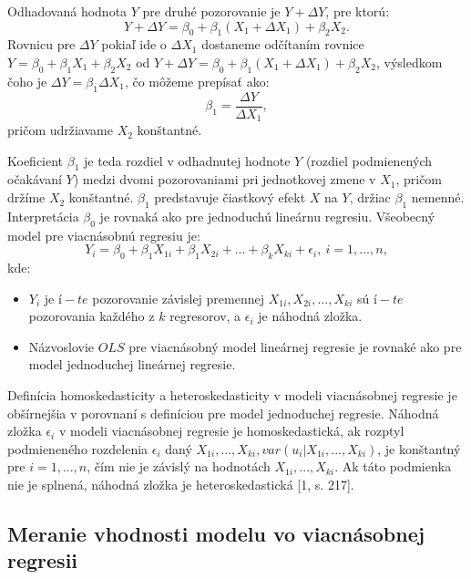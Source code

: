 \documentclass[]{tukediphc}
\begin{document}
Odhadovaná hodnota $Y$ pre druhé pozorovanie je $Y + \Delta Y$, pre ktorú:
\begin{equation}
    Y + \Delta Y = \beta_{0} + \beta_{1} (X_{1} + \Delta X_{1}) + \beta_{2} X_{2}.
\end{equation}
Rovnicu pre $\Delta Y$ pokiaľ ide o $\Delta X_{1}$ dostaneme odčítaním rovnice $Y = \beta_{0} + \beta_{1} X_{1} + \beta_{2} X_{2}$ od $Y + \Delta Y = \beta_{0} + \beta_{1} (X_{1} + \Delta X_{1}) + \beta_{2} X_{2}$, výsledkom čoho je $\Delta Y = \beta_{1}\Delta X_{1}$, čo môžeme prepísať ako:
\begin{equation}
    \beta_{1} = \frac{\Delta Y}{\Delta X_{1}},
\end{equation}
pričom udržiavame $X_2$ konštantné.

Koeficient $\beta_{1}$ je teda rozdiel v odhadnutej hodnote $Y$ (rozdiel podmienených očakávaní $Y$) medzi dvomi pozorovaniami pri jednotkovej zmene v $X_1$, pričom držíme $X_2$ konštantné. $\beta_{1}$ predstavuje čiastkový efekt $X$ na $Y$, držiac $\beta_{1}$ nemenné. Interpretácia $\beta_{0}$ je rovnaká ako pre jednoduchú lineárnu regresiu.  
Všeobecný model pre viacnásobnú regresiu je:
\begin{equation}
    Y_{i} = \beta_{0} + \beta_{1} X_{1i} + \beta_{1} X_{2i} + ... + \beta_{k} X_{ki} + \epsilon_{i}, \ i = 1, ..., n,
\end{equation}
kde:
\begin{itemize}
\item  $Y_i$ je $í-te$ pozorovanie závislej premennej $X_{1i}, X_{2i}, ..., X_{ki}$ sú $í-te$ pozorovania každého z $k$ regresorov, a $\epsilon_i$ je náhodná zložka.
\item Názvoslovie $OLS$ pre viacnásobný model lineárnej regresie je rovnaké ako pre model jednoduchej lineárnej regresie. 
\end{itemize}

Definícia homoskedasticity a heteroskedasticity v modeli viacnásobnej regresie je obšírnejšia v porovnaní s definíciou pre model jednoduchej regresie. Náhodná zložka $\epsilon_{i}$ v modeli viacnásobnej regresie je homoskedastická, ak rozptyl podmieneného rozdelenia $\epsilon_{i}$ daný $X_{1i}, ..., X_{ki}, var(u_{i}|X_{1i}, ..., X_{ki})$, je konštantný pre $i = 1, ..., n$, čím nie je závislý na hodnotách $X_{1i}, ..., X_{ki}$. Ak táto podmienka nie je splnená, náhodná zložka je heteroskedastická [1, s. 217].

\subsection{Meranie vhodnosti modelu vo viacnásobnej regresii}
\end{document}
